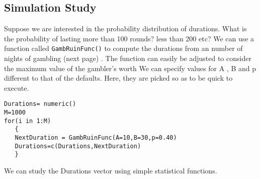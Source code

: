 \documentclass[11pt]{article} %
\begin{document}
\subsection{Simulation Study}
Suppose we are interested in the probability distribution of durations. What is the probability of lasting more than 100 rounds? less than 200 etc? We can use a function called \texttt{GambRuinFunc()} to compute the durations from an number of nights of gambling (next page) . The function can easily be adjusted to consider the maximum value of the gambler's worth
We can specify values for A , B and p different to that of the defaults. Here, they are picked so as to be quick to execute.
\begin{framed}
\begin{verbatim}
Durations= numeric()
M=1000
for(i in 1:M)
   {
   NextDuration = GambRuinFunc(A=10,B=30,p=0.40)
   Durations=c(Durations,NextDuration)
   } 
\end{verbatim}
\end{framed}

We can study the Durations vector  using simple statistical functions.
\end{document}
